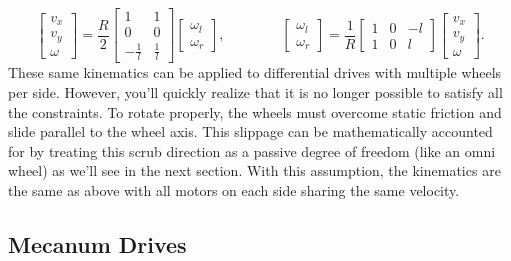 \documentclass{article}
\begin{document}
\begin{equation*}
    \begin{bmatrix}
        v_x \\
        v_y \\
        \omega
    \end{bmatrix}
    =
    \frac{R}{2}
    \begin{bmatrix}
        1 & 1 \\
        0 & 0 \\
        -\frac{1}{l} & \frac{1}{l}
    \end{bmatrix}
    \begin{bmatrix}
        \omega_l \\
        \omega_r
    \end{bmatrix},
    \qquad\qquad
    \begin{bmatrix}
        \omega_l \\
        \omega_r
    \end{bmatrix}
    =
    \frac{1}{R}
    \begin{bmatrix}
        1 & 0 & -l\\
        1 & 0 & l
    \end{bmatrix}
    \begin{bmatrix}
        v_x \\
        v_y \\
        \omega
    \end{bmatrix}.
\end{equation*}
These same kinematics can be applied to differential drives with multiple wheels per side. However, you'll quickly realize that it is no longer possible to satisfy all the constraints. To rotate properly, the wheels must overcome static friction and slide parallel to the wheel axis. This slippage can be mathematically accounted for by treating this scrub direction as a passive degree of freedom (like an omni wheel) as we'll see in the next section. With this assumption, the kinematics are the same as above with all motors on each side sharing the same velocity.

\subsection{Mecanum Drives}
\end{document}

